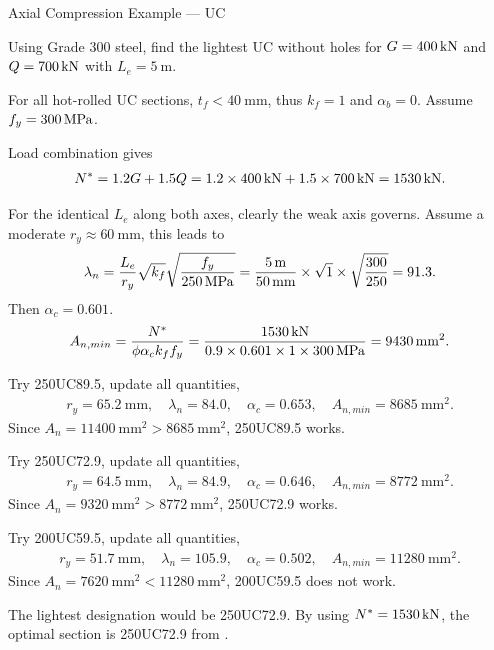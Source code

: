 \begin{exmp}
Axial Compression Example --- UC

Using Grade 300 steel, find the lightest UC without holes for $G=\SI{400}{\kilo\newton}$ and $Q=\SI{700}{\kilo\newton}$ with $L_e=\SI{5}{\meter}$.
\end{exmp}
\begin{solution}
For all hot-rolled UC sections, $t_f<\SI{40}{\mm}$, thus $k_f=1$ and $\alpha_b=0$. Assume $f_y=\SI{300}{\mega\pascal}$.

Load combination gives
\begin{gather*}
N^*=1.2G+1.5Q=1.2\times\SI{400}{\kilo\newton}+1.5\times\SI{700}{\kilo\newton}=\SI{1530}{\kilo\newton}.
\end{gather*}

For the identical $L_e$ along both axes, clearly the weak axis governs. Assume a moderate $r_y\approx\SI{60}{\mm}$, this leads to
\begin{gather*}
\lambda_n=\dfrac{L_e}{r_y}\sqrt{k_f}\sqrt{\dfrac{f_y}{\SI{250}{\mega\pascal}}}=\dfrac{\SI{5}{\meter}}{\SI{50}{\milli\meter}}\times\sqrt{1}\times\sqrt{\dfrac{300}{250}}=91.3.
\end{gather*}
Then $\alpha_c=0.601$.
\begin{gather*}
A_{n,min}=\dfrac{N^*}{\phi\alpha_ck_ff_y}=\dfrac{\SI{1530}{\kilo\newton}}{0.9\times0.601\times1\times\SI{300}{\mega\pascal}}=\SI{9430}{\milli\meter^2}.
\end{gather*}

Try 250UC89.5, update all quantities,
\begin{gather*}
r_y=\SI{65.2}{\mm},\quad
\lambda_n=84.0,\quad
\alpha_c=0.653,\quad
A_{n,min}=\SI{8685}{\mm^2}.
\end{gather*}
Since $A_n=\SI{11400}{\mm^2}>\SI{8685}{\mm^2}$, 250UC89.5 works.

Try 250UC72.9, update all quantities,
\begin{gather*}
r_y=\SI{64.5}{\mm},\quad
\lambda_n=84.9,\quad
\alpha_c=0.646,\quad
A_{n,min}=\SI{8772}{\mm^2}.
\end{gather*}
Since $A_n=\SI{9320}{\mm^2}>\SI{8772}{\mm^2}$, 250UC72.9 works.

Try 200UC59.5, update all quantities,
\begin{gather*}
r_y=\SI{51.7}{\mm},\quad
\lambda_n=105.9,\quad
\alpha_c=0.502,\quad
A_{n,min}=\SI{11280}{\mm^2}.
\end{gather*}
Since $A_n=\SI{7620}{\mm^2}<\SI{11280}{\mm^2}$, 200UC59.5 does not work.

The lightest designation would be 250UC72.9. By using $N^*=\SI{1530}{\kilo\newton}$, the optimal section is 250UC72.9 from .
\end{solution}

